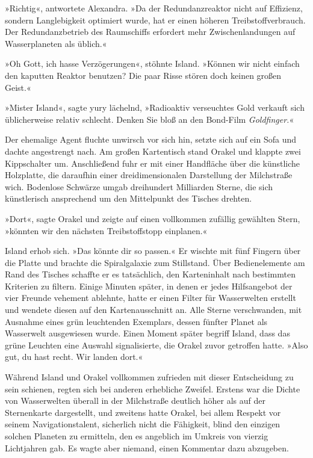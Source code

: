 »Richtig«, antwortete Alexandra. »Da der Redundanzreaktor nicht auf Effizienz, sondern Langlebigkeit optimiert wurde, hat er einen höheren Treibstoffverbrauch. Der Redundanzbetrieb des Raumschiffs erfordert mehr Zwischenlandungen auf Wasserplaneten als üblich.«

»Oh Gott, ich hasse Verzögerungen«, stöhnte Island. »Können wir nicht einfach den kaputten Reaktor benutzen? Die paar Risse stören doch keinen großen Geist.«

»Mister Island«, sagte yury lächelnd, »Radioaktiv verseuchtes Gold verkauft sich üblicherweise relativ schlecht. Denken Sie bloß an den Bond-Film \textit{Goldfinger.}«

Der ehemalige Agent fluchte unwirsch vor sich hin, setzte sich auf ein Sofa und dachte angestrengt nach. Am großen Kartentisch stand Orakel und klappte zwei Kippschalter um. Anschließend fuhr er mit einer Handfläche über die künstliche Holzplatte, die daraufhin einer dreidimensionalen Darstellung der Milchstraße wich. Bodenlose Schwärze umgab dreihundert Milliarden Sterne, die sich künstlerisch ansprechend um den Mittelpunkt des Tisches drehten.

»Dort«, sagte Orakel und zeigte auf einen vollkommen zufällig gewählten Stern, »könnten wir den nächsten Treibstoffstopp einplanen.«

Island erhob sich. »Das könnte dir so passen.« Er wischte mit fünf Fingern über die Platte und brachte die Spiralgalaxie zum Stillstand. Über Bedienelemente am Rand des Tisches schaffte er es tatsächlich, den Karteninhalt nach bestimmten Kriterien zu filtern. Einige Minuten später, in denen er jedes Hilfsangebot der vier Freunde vehement ablehnte, hatte er einen Filter für Wasserwelten erstellt und wendete diesen auf den Kartenausschnitt an. Alle Sterne verschwanden, mit Ausnahme eines grün leuchtenden Exemplars, dessen fünfter Planet als Wasserwelt ausgewiesen wurde. Einen Moment später begriff Island, dass das grüne Leuchten eine Auswahl signalisierte, die Orakel zuvor getroffen hatte. »Also gut, du hast recht. Wir landen dort.«

Während Island und Orakel vollkommen zufrieden mit dieser Entscheidung zu sein schienen, regten sich bei anderen erhebliche Zweifel. Erstens war die Dichte von Wasserwelten überall in der Milchstraße deutlich höher als auf der Sternenkarte dargestellt, und zweitens hatte Orakel, bei allem Respekt vor seinem Navigationstalent, sicherlich nicht die Fähigkeit, blind den einzigen solchen Planeten zu ermitteln, den es angeblich im Umkreis von vierzig Lichtjahren gab. Es wagte aber niemand, einen Kommentar dazu abzugeben.

